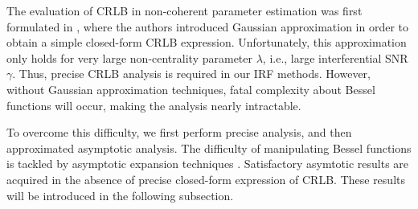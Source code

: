 \documentclass[12pt,draftclsnofoot,journal,onecolumn]{IEEEtran}
\theoremstyle{nonumberplain}
\begin{document}
    The evaluation of CRLB in non-coherent parameter estimation was first formulated in \cite{jiang2016cramer}, where the authors introduced Gaussian approximation in order to obtain a simple closed-form CRLB expression. Unfortunately, this approximation only holds for very large non-centrality parameter $\lambda$, i.e., large interferential SNR $\gamma$. Thus, precise CRLB analysis is required in our \ac{IRF} methods. However, without Gaussian approximation techniques, fatal complexity about Bessel functions will occur, making the analysis nearly intractable. 

    To overcome this difficulty, we first perform precise analysis, and then approximated asymptotic analysis. The difficulty of manipulating Bessel functions is tackled by asymptotic expansion techniques \cite{silverman1972special}. Satisfactory asymtotic results are acquired in the absence of precise closed-form expression of CRLB. These results will be introduced in the following subsection.  
    
\end{document}
